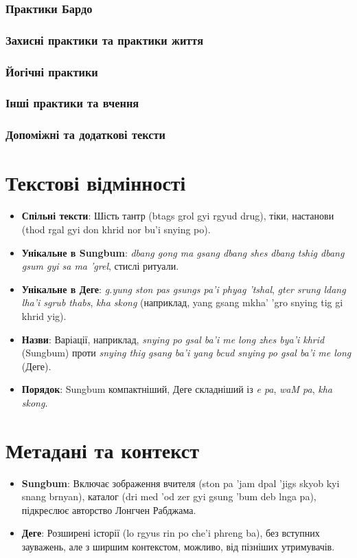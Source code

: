 \documentclass{article}
\begin{document}
\subsubsection{Практики Бардо}
\subsubsection{Захисні практики та практики життя}
\subsubsection{Йогічні практики}
\subsubsection{Інші практики та вчення}
\subsubsection{Допоміжні та додаткові тексти}

\newpage
\section{Текстові відмінності}
\begin{itemize}
    \item \textbf{Спільні тексти}: Шість тантр (btags grol gyi rgyud drug), тіки, настанови (thod rgal gyi don khrid nor bu'i snying po).
    \item \textbf{Унікальне в Sungbum}: \textit{dbang gong ma gsang dbang shes dbang tshig dbang gsum gyi sa ma 'grel}, стислі ритуали.
    \item \textbf{Унікальне в Деге}: \textit{g.yung ston pas gsungs pa'i phyag 'tshal}, \textit{gter srung ldang lha'i sgrub thabs}, \textit{kha skong} (наприклад, yang gsang mkha' 'gro snying tig gi khrid yig).
    \item \textbf{Назви}: Варіації, наприклад, \textit{snying po gsal ba'i me long zhes bya'i khrid} (Sungbum) проти \textit{snying thig gsang ba'i yang bcud snying po gsal ba'i me long} (Деге).
    \item \textbf{Порядок}: Sungbum компактніший, Деге складніший із \textit{e pa}, \textit{waM pa}, \textit{kha skong}.
\end{itemize}

\newpage
\section{Метадані та контекст}
\begin{itemize}
    \item \textbf{Sungbum}: Включає зображення вчителя (ston pa 'jam dpal 'jigs skyob kyi snang brnyan), каталог (dri med 'od zer gyi gsung 'bum deb lnga pa), підкреслює авторство Лонгчен Рабджама.
    \item \textbf{Деге}: Розширені історії (lo rgyus rin po che'i phreng ba), без вступних зауважень, але з ширшим контекстом, можливо, від пізніших утримувачів.
\end{itemize}
\end{document}
